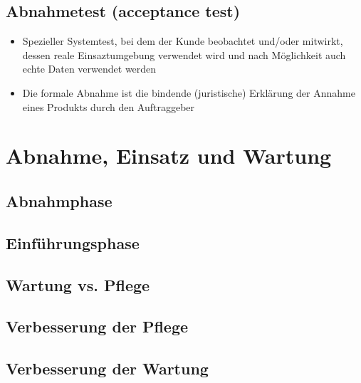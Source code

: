\documentclass{article}
\begin{document}
\subsection{Abnahmetest (acceptance test)}
\begin{itemize}
  \item Spezieller Systemtest, bei dem der Kunde beobachtet und/oder mitwirkt, dessen reale Einsaztumgebung verwendet wird und nach Möglichkeit auch echte Daten verwendet werden
  \item Die formale Abnahme ist die bindende (juristische) Erklärung der Annahme eines Produkts durch den Auftraggeber
\end{itemize}

\section{Abnahme, Einsatz und Wartung}
\subsection{Abnahmphase}
\subsection{Einführungsphase}
\subsection{Wartung vs. Pflege}
\subsection{Verbesserung der Pflege}
\subsection{Verbesserung der Wartung}
\end{document}

